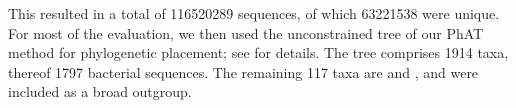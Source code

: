 This resulted in a total of \num{116 520 289} sequences, of which \num{63 221 538} were unique.
For most of the evaluation, we then used the unconstrained  tree
of our \ac{PhAT} method \cite{Czech2018-phat} for phylogenetic placement;
see  for details.
The tree comprises \num{1 914} taxa, thereof \num{1 797} bacterial sequences.
The remaining \num{117} taxa are  and ,
and were included as a broad outgroup.



